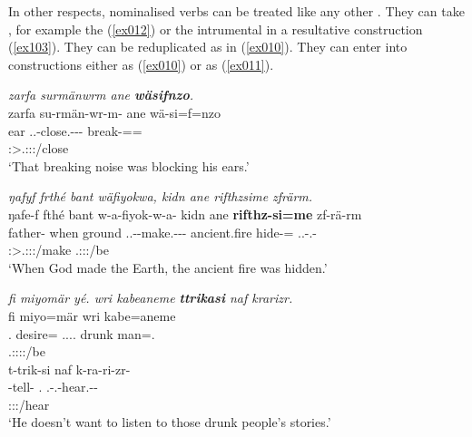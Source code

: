 In other respects, nominalised verbs can be treated like any other . They can take , for example the  (\ref{ex012}) or the intrumental in a resultative construction (\ref{ex103}). They can be reduplicated as in (\ref{ex010}). They can enter into  constructions either as  (\ref{ex010}) or as  (\ref{ex011}).

\begin{exe}
	\ex \textit{zarfa surmänwrm ane \textbf{wäsifnzo}.}\\
	\glll zarfa su-rmän-wr-m-\Zero{} ane wä-si=f=nzo\\
	ear \Tsg.\Masc.\Betatwo-close.\Ext-\Ndu-\Dur-\Stnsg{} \Dem{} break-\Nmlz{}=\Erg{}=\Only{}\\
	{} \footnotesize{\Stsg:\Sbj>\Tsg.\Masc:\Obj:\Pst:\Dur/close} {} {}\\
	\trans `That breaking noise was blocking his ears.'
	\label{ex012}
\end{exe}
\begin{exe}
	\ex \emph{ŋafyf frthé bant wäfiyokwa, kidn ane rifthzsime zfrärm.}\\
	\glll ŋafe-f fthé bant w-a-fiyok-w-a-\Zero{} kidn ane \textbf{rifthz-si=me} zf-rä-rm\\
	father-\Erg{} when ground \Tsg.\F.\Alph-\Vc-make.\Ext-\Ndu-\Pst-\Stsg{} ancient.fire \Dem{} hide-\Nmlz{}=\Ins{} \Tsg.\F.\Betatwo-\Cop.\Ndu-\Dur\\
	{} {} {} \footnotesize{\Stsg:\Sbj>\Tsg.\F:\Obj:\Pst:\Ipfv/make} {} {} {} \footnotesize{\Tsg.\F:\Sbj:\Pst:\Dur/be}\\
	\trans `When God made the Earth, the ancient fire was hidden.'\\
	\label{ex103}
\end{exe}
\begin{exe}
	\ex \textit{fi miyomär yé. wri kabeaneme \textbf{ttrikasi} naf krarizr.}\\
	\glll fi miyo=mär  wri kabe=aneme\\
	\Third{}.\Abs{} desire=\Priv{} \Tsg.\Masc.\Alph.\Cop.\Ndu{} drunk man=\Poss{}.\Nsg{}\\
	{} {} \footnotesize{\Tsg{}.\Masc{}:\Alph:\Sbj:\Nonpast:\Ipfv/be} {} {}\\
	\sn
	\glll t-trik-si naf k-ra-ri-zr-\Zero{}\\
	\Redup{}-tell-\Nmlz{} \Tsg{}.\Erg{} \M.\Bet-\Irr.\Vc-hear.\Ext-\Ndu-\Stsg{}\\
	{} {} \footnotesize{\Stsg:\Sbj:\Irr:\Ipfv/hear}\\
	\trans `He doesn't want to listen to those drunk people's stories.'\\
	\label{ex010}
\end{exe}
